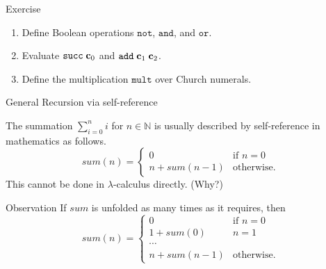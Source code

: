 \begin{frame}{Exercise}
  \begin{enumerate}
    \item Define Boolean operations $\mathtt{not}$, $\mathtt{and}$, and $\mathtt{or}$.
    \item Evaluate $\mathtt{succ}\;\mathbf{c}_0$ and $\mathtt{add}\;\mathbf{c}_{1}\;\mathbf{c}_{2}$. 
    \item Define the multiplication $\mathtt{mult}$ over Church numerals.

  \end{enumerate}
\end{frame}
\begin{frame}{General Recursion via self-reference}

  The summation $\sum_{i = 0}^{n} i$ for $n \in \mathbb{N}$ is usually
  described by self-reference in mathematics as follows.
\[
  \mathit{sum}(n) =
    \begin{cases} 
     0 & \text{if } n = 0 \\
     n + \mathit{sum}(n - 1)  & \text{otherwise}.
    \end{cases}
\]
This \alert{cannot} be done in $\lambda$-calculus directly. (Why?)

\begin{block}{Observation}
  If $\mathit{sum}$ is unfolded as many times as it requires, then
\[
  \mathit{sum}(n) =
    \begin{cases} 
     0 & \text{if } n = 0 \\
     1 + \mathit{sum}(0) & n = 1 \\
     \cdots \\
     n + \mathit{sum}(n - 1)  & \text{otherwise}.
    \end{cases}
\]
  
\end{block}



\end{frame}

